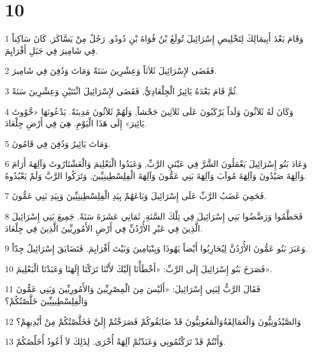 \chapter{10}

\par 1 وَقَامَ بَعْدَ أَبِيمَالِكَ لِتَخْلِيصِ إِسْرَائِيلَ تُولَعُ بْنُ فُوَاةَ بْنِ دُودُو, رَجُلٌ مِنْ يَسَّاكَرَ, كَانَ سَاكِناً فِي شَامِيرَ فِي جَبَلِ أَفْرَايِمَ.
\par 2 فَقَضَى لإِسْرَائِيلَ ثَلاَثاً وَعِشْرِينَ سَنَةً وَمَاتَ وَدُفِنَ فِي شَامِيرَ.
\par 3 ثُمَّ قَامَ بَعْدَهُ يَائِيرُ الْجِلْعَادِيُّ, فَقَضَى لإِسْرَائِيلَ اثْنَتَيْنِ وَعِشْرِينَ سَنَةً.
\par 4 وَكَانَ لَهُ ثَلاَثُونَ وَلَداً يَرْكَبُونَ عَلَى ثَلاَثِينَ جَحْشاً, وَلَهُمْ ثَلاَثُونَ مَدِينَةً. يَدْعُونَهَا «حَّوُوثَ يَائِيرَ» إِلَى هَذَا الْيَوْمِ. هِيَ فِي أَرْضِ جِلْعَادَ.
\par 5 وَمَاتَ يَائِيرُ وَدُفِنَ فِي قَامُونَ.
\par 6 وَعَادَ بَنُو إِسْرَائِيلَ يَعْمَلُونَ الشَّرَّ فِي عَيْنَيِ الرَّبِّ, وَعَبَدُوا الْبَعْلِيمَ وَالْعَشْتَارُوثَ وَآلِهَةَ أَرَامَ وَآلِهَةَ صَيْدُونَ وَآلِهَةَ مُوآبَ وَآلِهَةَ بَنِي عَمُّونَ وَآلِهَةَ الْفِلِسْطِينِيِّينَ, وَتَرَكُوا الرَّبَّ وَلَمْ يَعْبُدُوهُ.
\par 7 فَحَمِيَ غَضَبُ الرَّبِّ عَلَى إِسْرَائِيلَ وَبَاعَهُمْ بِيَدِ الْفِلِسْطِينِيِّينَ وَبِيَدِ بَنِي عَمُّونَ.
\par 8 فَحَطَّمُوا وَرَضَّضُوا بَنِي إِسْرَائِيلَ فِي تِلْكَ السَّنَةِ. ثَمَانِي عَشَرَةَ سَنَةً. جَمِيعَ بَنِي إِسْرَائِيلَ الَّذِينَ فِي عَبْرِ الأُرْدُنِّ فِي أَرْضِ الأَمُورِيِّينَ الَّذِينَ فِي جِلْعَادَ.
\par 9 وَعَبَرَ بَنُو عَمُّونَ الأُرْدُنَّ لِيُحَارِبُوا أَيْضاً يَهُوذَا وَبِنْيَامِينَ وَبَيْتَ أَفْرَايِمَ. فَتَضَايَقَ إِسْرَائِيلُ جِدّاً.
\par 10 فَصَرَخَ بَنُو إِسْرَائِيلَ إِلَى الرَّبِّ: «أَخْطَأْنَا إِلَيْكَ لأَنَّنَا تَرَكْنَا إِلَهَنَا وَعَبَدْنَا الْبَعْلِيمَ».
\par 11 فَقَالَ الرَّبُّ لِبَنِي إِسْرَائِيلَ: «أَلَيْسَ مِنَ الْمِصْرِيِّينَ وَالأَمُورِيِّينَ وَبَنِي عَمُّونَ وَالْفِلِسْطِينِيِّينَ خَلَّصْتُكُمْ؟
\par 12 وَالصَّيْدُونِيُّونَ وَالْعَمَالِقَةُوَالْمَعُونِيُّونَ قَدْ ضَايَقُوكُمْ فَصَرَخْتُمْ إِلَيَّ فَخَلَّصْتُكُمْ مِنْ أَيْدِيهِمْ؟
\par 13 وَأَنْتُمْ قَدْ تَرَكْتُمُونِي وَعَبَدْتُمْ آلِهَةً أُخْرَى. لِذَلِكَ لاَ أَعُودُ أُخَلِّصُكُمْ.
